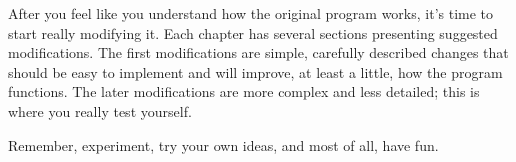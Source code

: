 After you feel like you understand how the original program works, it's time to start really modifying it.  Each chapter has several sections presenting suggested modifications.  The first modifications are simple, carefully described changes that should be easy to implement and will improve, at least a little, how the program functions.  The later modifications are more complex and less detailed; this is where you really test yourself.  

Remember, experiment, try your own ideas, and most of all, have fun.


